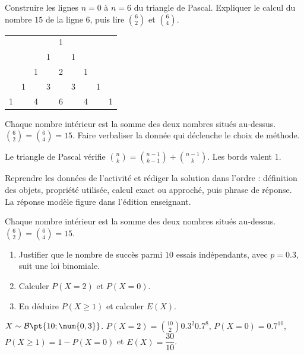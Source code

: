 \begin{activity}
Construire les lignes $n=0$ à $n=6$ du triangle de Pascal. Expliquer le calcul du nombre $15$ de la ligne $6$, puis lire $\binom62$ et $\binom64$.
\begin{center}\begin{tabular}{*{9}{c}}&&&&1&&&&\\&&&1&&1&&&\\&&1&&2&&1&&\\&1&&3&&3&&1&\\1&&4&&6&&4&&1\end{tabular}\end{center}
\end{activity}
\begin{solution}Chaque nombre intérieur est la somme des deux nombres situés au-dessus. $\binom62=\binom64=15$. Faire verbaliser la donnée qui déclenche le choix de méthode.\end{solution}

\begin{summary}Le triangle de Pascal vérifie $\binom nk=\binom{n-1}{k-1}+\binom{n-1}{k}$. Les bords valent $1$.\end{summary}

\begin{example}
Reprendre les données de l'activité et rédiger la solution dans l'ordre : définition des objets, propriété utilisée, calcul exact ou approché, puis phrase de réponse. La réponse modèle figure dans l'édition enseignant.
\end{example}
\begin{solution}Chaque nombre intérieur est la somme des deux nombres situés au-dessus. $\binom62=\binom64=15$.\end{solution}

\begin{exercise}[essentiel]
\begin{enumerate}\item Justifier que le nombre de succès parmi $10$ essais indépendants, avec $p=\num{0,3}$, suit une loi binomiale.\item Calculer $P(X=2)$ et $P(X=0)$.\item En déduire $P(X\geq1)$ et calculer $E(X)$.\end{enumerate}
\end{exercise}
\begin{solution}$X\sim\mathcal B\pt{10;\num{0,3}}$. $P(X=2)=\binom{10}2 \num{0,3}^2 \num{0,7}^{8}$, $P(X=0)=\num{0,7}^{10}$, $P(X\geq1)=1-P(X=0)$ et $E(X)=\dfrac{30}{10}$.\end{solution}


